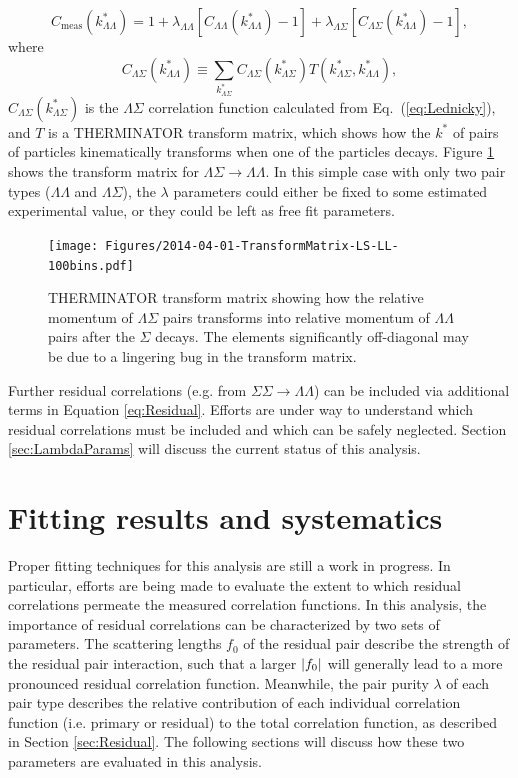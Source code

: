 \begin{equation}
\label{eq:Residual}
C_{\mathrm{meas}}(k^*_{\Lambda\Lambda})= 1 + \lambda_{\Lambda\Lambda}[C_{\Lambda\Lambda}(k^*_{\Lambda\Lambda})-1]+\lambda_{\Lambda\Sigma}[C_{\Lambda\Sigma}(k^*_{\Lambda\Lambda})-1],
\end{equation}
where $$C_{\Lambda\Sigma}(k^*_{\Lambda\Lambda}) \equiv \displaystyle\sum\limits_{k^*_{\Lambda\Sigma}}C_{\Lambda\Sigma}(k^*_{\Lambda\Sigma})T(k^*_{\Lambda\Sigma},k^*_{\Lambda\Lambda}),$$ $C_{\Lambda\Sigma}(k^*_{\Lambda\Sigma})$ is the $\Lambda\Sigma$ correlation function calculated from Eq.~(\ref{eq:Lednicky}), and $T$ is a THERMINATOR \cite{Chojnacki:2011hb} transform matrix, which shows how the $k^*$ of pairs of particles kinematically transforms when one of the particles decays.  Figure \ref{fig:TherminatorLS} shows the transform matrix for $\Lambda\Sigma \rightarrow \Lambda\Lambda$.  In this simple case with only two pair types ($\Lambda\Lambda$ and $\Lambda\Sigma$), the $\lambda$ parameters could either be fixed to some estimated experimental value, or they could be left as free fit parameters.

\begin{figure}[hbtp]
\texttt{[image: Figures/2014-04-01-TransformMatrix-LS-LL-100bins.pdf]}
\caption[Transform matrix for $k^*_{\Lambda\Sigma} \rightarrow k^*_{\Lambda\Lambda}$]{THERMINATOR \cite{Chojnacki:2011hb} transform matrix showing how the relative momentum of $\Lambda\Sigma$ pairs transforms into relative momentum of $\Lambda\Lambda$ pairs after the $\Sigma$ decays.  The elements significantly off-diagonal may be due to a lingering bug in the transform matrix.}
\label{fig:TherminatorLS}
\end{figure}

Further residual correlations (e.g. from $\Sigma\Sigma \rightarrow \Lambda\Lambda$) can be included via additional terms in Equation \ref{eq:Residual}.  Efforts are under way to understand which residual correlations must be included and which can be safely neglected.  Section \ref{sec:LambdaParams} will discuss the current status of this analysis. 

\section{Fitting results and systematics}
\label{sec:FittingSystematics}

Proper fitting techniques for this analysis are still a work in progress.  In particular, efforts are being made to evaluate the extent to which residual correlations permeate the measured correlation functions.  In this analysis, the importance of residual correlations can be characterized by two sets of parameters.  The scattering lengths $f_0$ of the residual pair describe the strength of the residual pair interaction, such that a larger $\left\lvert f_0\right\rvert$ will generally lead to a more pronounced residual correlation function.  Meanwhile, the pair purity $\lambda$ of each pair type describes the relative contribution of each individual correlation function (i.e. primary or residual) to the total correlation function, as described in Section \ref{sec:Residual}. The following sections will discuss how these two parameters are evaluated in this analysis.


